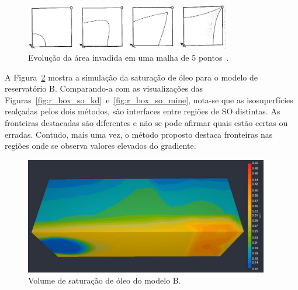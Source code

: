 \begin{figure}[h]
	\centering
	\includegraphics[width=0.8\textwidth]{images/reserv_livro}
	\caption{Evolução da área invadida em uma malha de 5 pontos~\cite{rosa}.}
	\label{fig:r_reserv_livro}
\end{figure}
	
\newpage
	A Figura~\ref{fig:r_box_so_slice} mostra a simulação da saturação de óleo para o modelo de reservatório B. Comparando-a com as visualizações das Figuras~\ref{fig:r_box_so_kd}~e~\ref{fig:r_box_so_mine}, nota-se que as isosuperfícies realçadas pelos dois métodos, são interfaces entre regiões de SO distintas. As fronteiras destacadas são diferentes e não se pode afirmar quais estão certas ou erradas. Contudo, mais uma vez, o método proposto destaca fronteiras nas regiões onde se observa valores elevados do gradiente.

\begin{figure}[h]
	\centering
	\includegraphics[width=0.95\textwidth]{images/r_box_so_slice}
	\caption{Volume de saturação de óleo do modelo B.}
	\label{fig:r_box_so_slice}
\end{figure}

